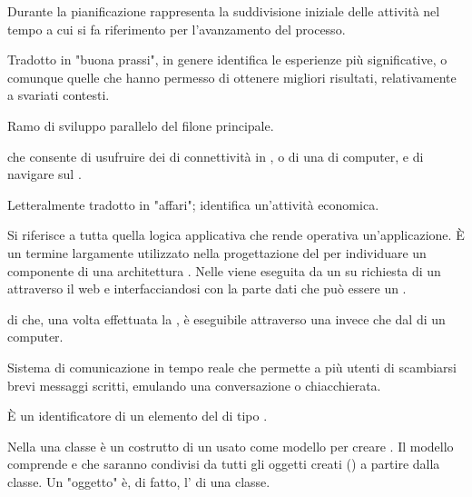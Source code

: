 {Durante la pianificazione rappresenta la suddivisione iniziale delle attività nel tempo a cui si fa riferimento per l'avanzamento del processo.}

{Tradotto in "buona prassi", in genere identifica le esperienze più significative, o comunque quelle che hanno permesso di ottenere migliori risultati, relativamente a svariati contesti.}

{Ramo di sviluppo parallelo del filone principale.}

{ che consente di usufruire dei  di connettività in , o di una  di computer, e di navigare sul .}


{Letteralmente tradotto in "affari"; identifica un'attività economica.}


{Si riferisce a tutta quella logica applicativa che rende operativa un'applicazione. \`{E} un termine largamente utilizzato nella progettazione del  per individuare un componente  di una architettura . Nelle     viene eseguita da un  su richiesta di un  attraverso il    web e interfacciandosi con la parte dati che può essere un .}



{ di  che, una volta effettuata la , è eseguibile attraverso una  invece che dal  di un computer.}


{Sistema di comunicazione in tempo reale che permette a più utenti di scambiarsi brevi messaggi scritti, emulando una conversazione o chiacchierata.}

{\`{E} un identificatore di un elemento del  di tipo .}

{Nella   una classe è un costrutto di un  usato come modello per creare . Il modello comprende  e  che saranno condivisi da tutti gli oggetti creati () a partire dalla classe. Un "oggetto" è, di fatto, l' di una classe.}

